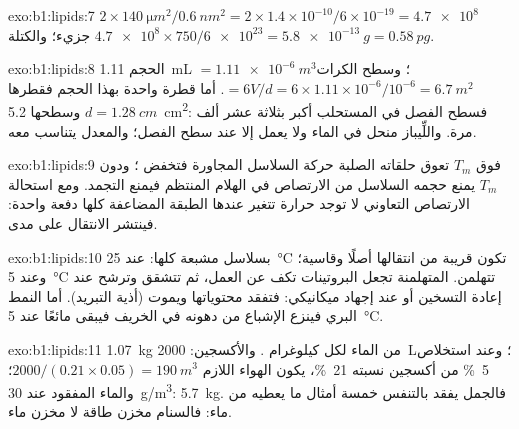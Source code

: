 \begin{solution}{exo:b1:lipids:7}
$2\times\qty{140}{\micro m^2}/\qty{0.6}{nm^2} = 2\times 1.4\times
10^{-10}/6\times 10^{-19} = \num{4.7e8}$ جزيء؛ والكتلة
$\num{4.7e8}\times 750/\num{6e23} = \qty{5.8e-13}{g} = \qty{0.58}{pg}$.
\end{solution}

\begin{solution}{exo:b1:lipids:8}
الحجم \qty{1.11}{mL} $= \qty{1.11e-6}{m^3}$؛ وسطح الكرات
$= 6V/d = 6\times 1.11\times 10^{-6}/10^{-6} = \qty{6.7}{m^2}$. أما
قطرة واحدة بهذا الحجم فقطرها $d = \qty{1.28}{cm}$ وسطحها
\qty{5.2}{cm^2}: فسطح الفصل في المستحلب أكبر بثلاثة عشر ألف مرة.
واللِّيباز منحل في الماء ولا يعمل إلا عند سطح الفصل؛ والمعدل يتناسب
معه.
\end{solution}

\begin{solution}{exo:b1:lipids:9}
فوق $T_m$ تعوق حلقاته الصلبة حركة السلاسل المجاورة فتخفض ؛
ودون $T_m$ يمنع حجمه السلاسل من الارتصاص في الهلام المنتظم فيمنع
التجمد. ومع استحالة الارتصاص التعاوني لا توجد حرارة تتغير عندها
الطبقة المضاعفة كلها دفعة واحدة: فينتشر الانتقال على مدى.
\end{solution}

\begin{solution}{exo:b1:lipids:10}
بسلاسل مشبعة كلها: عند \qty{25}{\celsius} تكون  قريبة من
انتقالها أصلًا وقاسية؛ وعند \qty{5}{\celsius} تتهلمن. 
المتهلمنة تجعل البروتينات تكف عن العمل، ثم تتشقق وترشح عند إعادة
التسخين أو عند إجهاد ميكانيكي: فتفقد  محتوياتها ويموت 
(أذية التبريد). أما النمط البري فينزع الإشباع من دهونه في الخريف
فيبقى مائعًا عند \qty{5}{\celsius}.
\end{solution}

\begin{solution}{exo:b1:lipids:11}
\qty{1.07}{kg} من الماء لكل كيلوغرام . والأكسجين: \qty{2000}{L}؛
وعند استخلاص \qty{5}{\%} من أكسجين نسبته \qty{21}{\%}، يكون الهواء
اللازم $2000/(0.21\times 0.05) = \qty{190}{m^3}$؛ والماء المفقود عند
\qty{30}{g/m^3}: \qty{5.7}{kg}. فالجمل يفقد بالتنفس خمسة أمثال ما
يعطيه  من ماء: فالسنام مخزن طاقة لا مخزن ماء.
\end{solution}

